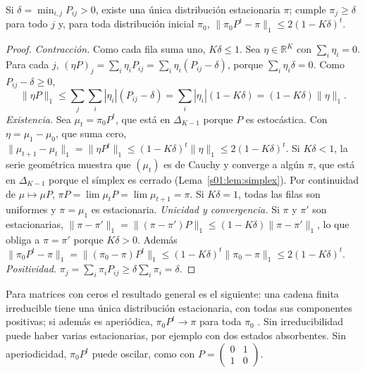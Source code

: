 \begin{teorema}\label{s01:teo:estacionaria}
Si $\delta=\min_{i,j}P_{ij}>0$, existe una única distribución estacionaria $\pi$;
cumple $\pi_j\ge\delta$ para todo $j$ y, para toda distribución inicial $\pi_0$,
$\|\pi_0P^t-\pi\|_1\le2(1-K\delta)^t$.
\end{teorema}
\begin{proof}
\emph{Contracción.} Como cada fila suma uno, $K\delta\le1$. Sea $\eta\in\mathbb R^K$
con $\sum_i\eta_i=0$. Para cada $j$,
$(\eta P)_j=\sum_i\eta_iP_{ij}=\sum_i\eta_i(P_{ij}-\delta)$, porque
$\sum_i\eta_i\delta=0$. Como $P_{ij}-\delta\ge0$,
\[
\|\eta P\|_1\le\sum_j\sum_i|\eta_i|(P_{ij}-\delta)=\sum_i|\eta_i|(1-K\delta)
=(1-K\delta)\|\eta\|_1.
\]
\emph{Existencia.} Sea $\mu_t=\pi_0P^t$, que está en $\Delta_{K-1}$ porque $P$ es
estocástica. Con $\eta=\mu_1-\mu_0$, que suma cero,
$\|\mu_{t+1}-\mu_t\|_1=\|\eta P^t\|_1\le(1-K\delta)^t\|\eta\|_1\le2(1-K\delta)^t$.
Si $K\delta<1$, la serie geométrica muestra que $(\mu_t)$ es de Cauchy y converge a
algún $\pi$, que está en $\Delta_{K-1}$ porque el símplex es cerrado
(Lema~\ref{s01:lem:simplex}). Por continuidad de $\mu\mapsto\mu P$,
$\pi P=\lim\mu_tP=\lim\mu_{t+1}=\pi$. Si $K\delta=1$, todas las filas son uniformes
y $\pi=\mu_1$ es estacionaria.
\emph{Unicidad y convergencia.} Si $\pi$ y $\pi'$ son estacionarias,
$\|\pi-\pi'\|_1=\|(\pi-\pi')P\|_1\le(1-K\delta)\|\pi-\pi'\|_1$, lo que obliga a
$\pi=\pi'$ porque $K\delta>0$. Además
$\|\pi_0P^t-\pi\|_1=\|(\pi_0-\pi)P^t\|_1\le(1-K\delta)^t\|\pi_0-\pi\|_1\le2(1-K\delta)^t$.
\emph{Positividad.} $\pi_j=\sum_i\pi_iP_{ij}\ge\delta\sum_i\pi_i=\delta$.
\end{proof}
\noindent Para matrices con ceros el resultado general es el siguiente: una cadena
finita irreducible tiene una única distribución estacionaria, con todas sus
componentes positivas; si además es aperiódica, $\pi_0P^t\to\pi$ para toda
$\pi_0$ \citep[secs.~1.7--1.8]{norris1997markov}. Sin irreducibilidad puede haber
varias estacionarias, por ejemplo con dos estados absorbentes. Sin aperiodicidad,
$\pi_0P^t$ puede oscilar, como con $P=\left(\begin{smallmatrix}0&1\\1&0\end{smallmatrix}\right)$.

